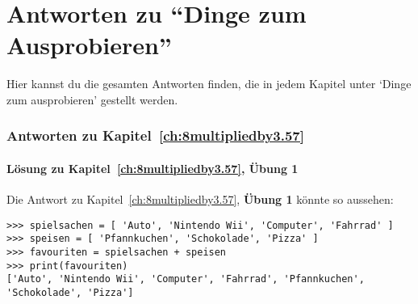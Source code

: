 

\chapter{Antworten zu ``Dinge zum Ausprobieren''}\label{app:answers}

Hier kannst du die gesamten Antworten finden, die in jedem Kapitel unter `Dinge zum ausprobieren' gestellt werden.

\subsection*{Antworten zu Kapitel~\ref{ch:8multipliedby3.57}}

\subsubsection{Lösung zu Kapitel~\ref{ch:8multipliedby3.57}, Übung 1}
Die Antwort zu Kapitel~\ref{ch:8multipliedby3.57}, \textbf{Übung 1} könnte so aussehen:

\begin{Verbatim}[frame=single]
>>> spielsachen = [ 'Auto', 'Nintendo Wii', 'Computer', 'Fahrrad' ]
>>> speisen = [ 'Pfannkuchen', 'Schokolade', 'Pizza' ]
>>> favouriten = spielsachen + speisen
>>> print(favouriten)
['Auto', 'Nintendo Wii', 'Computer', 'Fahrrad', 'Pfannkuchen', 'Schokolade', 'Pizza']
\end{Verbatim}

